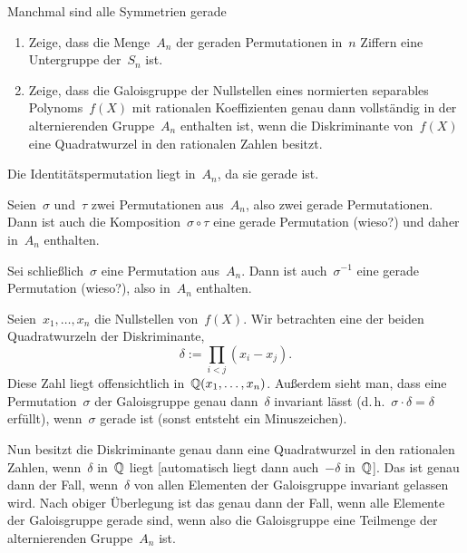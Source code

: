 \documentclass{algblatt}
\begin{document}
\begin{aufgabe}{Manchmal sind alle Symmetrien gerade}
\begin{enumerate}
\item Zeige, dass die Menge~$A_n$ der geraden Permutationen in~$n$ Ziffern eine
Untergruppe der~$S_n$ ist.

\item Zeige, dass die Galoisgruppe der Nullstellen eines normierten separables
Polynoms~$f(X)$ mit rationalen Koeffizienten genau dann vollständig in der
alternierenden Gruppe~$A_n$ enthalten ist, wenn die Diskriminante von~$f(X)$
eine Quadratwurzel in den rationalen Zahlen besitzt.
\end{enumerate}

\begin{loesungE}
\item Die Identitätspermutation liegt in~$A_n$, da sie gerade ist.

Seien~$\sigma$ und~$\tau$ zwei Permutationen aus~$A_n$, also zwei gerade
Permutationen. Dann ist auch die Komposition~$\sigma \circ \tau$ eine gerade
Permutation (wieso?) und daher in~$A_n$ enthalten.

Sei schließlich~$\sigma$ eine Permutation aus~$A_n$. Dann ist
auch~$\sigma^{-1}$ eine gerade Permutation (wieso?), also in~$A_n$ enthalten.

\item Seien~$x_1, \ldots, x_n$ die Nullstellen von~$f(X)$. Wir betrachten eine
der beiden Quadratwurzeln der Diskriminante,
\[ \delta := \prod_{i < j} (x_i - x_j). \]
Diese Zahl liegt offensichtlich in~$\mathbb{Q}(x_1,\ldots,x_n)$. Außerdem sieht man,
dass eine Permutation~$\sigma$ der Galoisgruppe genau dann~$\delta$ invariant
lässt (d.\,h.~$\sigma \cdot \delta = \delta$ erfüllt), wenn~$\sigma$ gerade
ist (sonst entsteht ein Minuszeichen).

Nun besitzt die Diskriminante genau dann eine Quadratwurzel in den rationalen
Zahlen, wenn~$\delta$ in~$\mathbb{Q}$ liegt [automatisch liegt dann auch~$-\delta$
in~$\mathbb{Q}$]. Das ist genau dann der Fall, wenn~$\delta$ von allen Elementen der
Galoisgruppe invariant gelassen wird. Nach obiger Überlegung ist das genau dann
der Fall, wenn alle Elemente der Galoisgruppe gerade sind, wenn also die
Galoisgruppe eine Teilmenge der alternierenden Gruppe~$A_n$ ist.
\end{loesungE}
\end{aufgabe}
\end{document}
